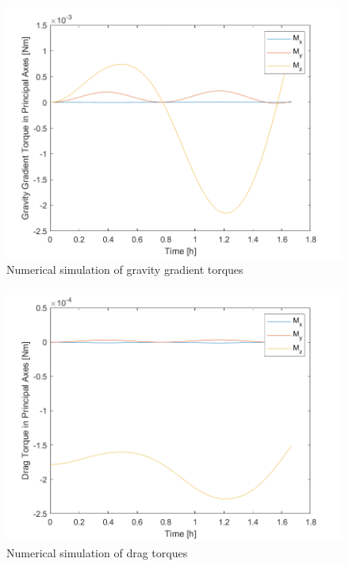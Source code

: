 \begin{figure}[H]
\centering
\includegraphics[scale=0.6]{Images/ps5_problem3_grav.png}
\caption{Numerical simulation of gravity gradient torques}
\label{fig:ps5_problem3_grav}
\end{figure}

\begin{figure}[H]
\centering
\includegraphics[scale=0.6]{Images/ps5_problem3_drag.png}
\caption{Numerical simulation of drag torques}
\label{fig:ps5_problem3_drag}
\end{figure}

